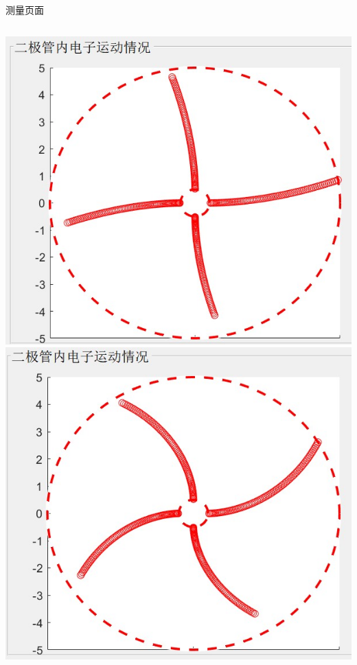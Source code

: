 \documentclass{beamer}
\begin{document}
    \begin{frame}{测量页面}{\thesection \, \secname}
        \begin{columns}
            \begin{column}{0.3\textwidth}
                \includegraphics[scale=0.3]{gallery/move5.jpg}
                \includegraphics[scale=0.3]{gallery/move6.jpg}
            \end{column}

\end{columns}
\end{frame}
\end{document}
